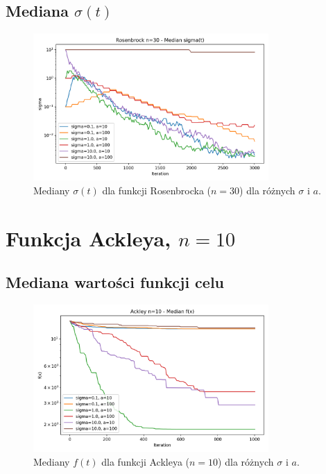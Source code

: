 \documentclass[a4paper,12pt]{article}
\begin{document}
\subsection{Mediana $\sigma(t)$}
\begin{figure}[H]
    \centering
    \includegraphics[width=0.8\textwidth]{charts/Rosenbrock_n30_all_sigmas.png}
    \caption{Mediany $\sigma(t)$ dla funkcji Rosenbrocka ($n=30$) dla różnych $\sigma$ i $a$.}
\end{figure}

\section{Funkcja Ackleya, $n=10$}
\subsection{Mediana wartości funkcji celu}
\begin{figure}[H]
    \centering
    \includegraphics[width=0.8\textwidth]{charts/Ackley_n10_all_medians.png}
    \caption{Mediany $f(t)$ dla funkcji Ackleya ($n=10$) dla różnych $\sigma$ i $a$.}
\end{figure}
\end{document}
